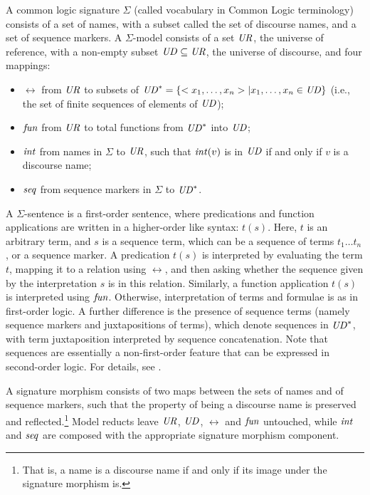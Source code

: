 \documentclass[10pt,fleqn,%
\ifpretendfinal
final%
\else
draft%
\fi,
]{scrreprt}
\begin{document}
\begin{definition}\label{CommonLogic}
A common logic signature
$\Sigma$ (called vocabulary in Common Logic terminology) consists of a
set of names, with a subset called the set of discourse names, and a
set of sequence markers. 
A $\Sigma$-model consists of a set $\mathit{UR}$,
the universe of reference, with a non-empty subset $\mathit{UD}\subseteq \mathit{UR}$,
the universe of discourse, and four mappings:
  \begin{itemize}
   \item $\rel$ from $\mathit{UR}$ to subsets of $\mathit{UD}^* = \{<x_1,\ldots,x_n> |
x_1,\ldots,x_n \in \mathit{UD}\}$ (i.e., the set of finite sequences of
elements of $\mathit{UD}$);
   \item $\mathit{fun}$ from $\mathit{UR}$ to total functions from $\mathit{UD}^*$ into $\mathit{UD}$;
   \item $\mathit{int}$ from names in $\Sigma$ to $\mathit{UR}$, such that
$\mathit{int}(v)$ is in $\mathit{UD}$ if and only if $v$ is a discourse name;
   \item $\mathit{seq}$ from sequence markers in $\Sigma$ to $\mathit{UD}^*$.
  \end{itemize}  A $\Sigma$-sentence is a first-order
sentence, where predications and function applications are written
in a higher-order like syntax: $t(s)$.
Here, $t$ is an arbitrary term, and $s$ is a sequence term, which can
be a sequence of terms $t_1\ldots t_n$, or a sequence marker.
A predication $t(s)$ is interpreted by evaluating the term $t$,
mapping it to a relation using $\rel$, and then asking whether the sequence
given by the interpretation $s$ is in this relation.  
Similarly, a function application $t(s)$ is interpreted using $\mathit{fun}$.
Otherwise, interpretation of terms and formulae is as in
first-order logic. 
A further
difference is the presence of sequence terms (namely sequence markers and
juxtapositions of terms), which denote sequences in $\mathit{UD}^*$, with term
juxtaposition interpreted by sequence concatenation.
Note that sequences are essentially a non-first-order feature that
can be expressed in second-order logic.
For details, see \cite{CommonLogic:oldfashioned}.

A \Clogic signature morphism 
consists of two maps between the sets of names and of sequence markers, such that the property of 
being a discourse name is preserved and reflected.\footnote{That is, a name is a discourse
name if and only if its image under the signature morphism is.}
  Model reducts leave $\mathit{UR}$, $\mathit{UD}$, 
$\rel$ and $\mathit{fun}$ untouched, while $\mathit{int}$ and $\mathit{seq}$ are composed with the appropriate
signature morphism component.
\end{definition}
%
\end{document}
